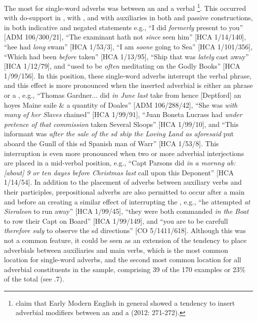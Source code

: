 The most  for single-word adverbs was between an  and a verbal \footnote{\citeauthor{MillwardHayes2012} claim that Early Modern English in general showed a tendency to insert adverbial modifiers between an  and a  (2012: 271-272).}. This occurred with do-support in , with , and with  auxiliaries in both  and passive constructions, in both indicative and negated statements e.g., “I did \textit{formerly} present to you” [ADM 106/300/21], “The examinant hath not \textit{since} seen him” [HCA 1/14/140], “hee had \textit{long} swam” [HCA 1/53/3], “I am \textit{soone} going to Sea” [HCA 1/101/356], “Which had been \textit{before} taken” [HCA 1/13/95], “Ship that was \textit{lately} cast away” [HCA 1/12/79], and “used to be \textit{often} meditating on the Godly Books” [HCA 1/99/156]. In this position, these single-word adverbs interrupt the verbal phrase, and this effect is more pronounced when the inserted adverbial is either an  phrase or a , e.g., “Thomas Gardner... did \textit{in June last} take from hence [Deptford] an hoyes Maine saile \& a quantity of Doales” [ADM 106/288/42], “She was \textit{with many of her Slaves} chained” [HCA 1/99/91],  “Juan Boneta Lucrass had \textit{under pretence of that commission} taken Several Sloops” [HCA 1/99/10], and “This informant was \textit{after the sale of the sd ship the Loving Land as aforesaid} put aboard the Gunll of this sd Spanish man of Warr” [HCA 1/53/8]. This interruption is even more pronounced when two or more adverbial interjections are placed in a mid-verbal position, e.g., “Capt Parsons did \textit{in a mornng ab:[about] 9 or ten dayes before Christmas last} call upon this Deponent” [HCA 1/14/54]. In addition to the placement of adverbs between auxiliary verbs and their participles, prepositional adverbs are also permitted to occur after a main  and before an  creating a similar effect of interrupting the , e.g., “he attempted \textit{at Sieraleon} to run away” [HCA 1/99/45], “they were both commanded \textit{in the Boat} to row their Capt on Board”  [HCA 1/99/149], and “you are to be carefull \textit{therefore suly} to observe the sd directions” [CO 5/1411/618]. Although this was not a common feature, it could be seen as an extension of the tendency to place adverbials between auxiliaries and main verbs, which is the most common location for single-word adverbs, and the second most common location for all adverbial constituents in the sample, comprising 39 of the 170 examples or 23\% of the total (see .7).


